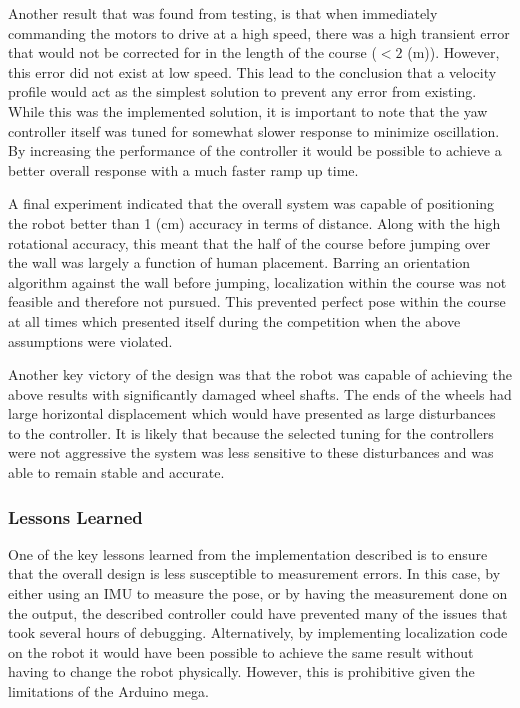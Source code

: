 \documentclass[ece]{uw-wkrpt}
\begin{document}
Another result that was found from testing, is that when immediately commanding the motors to drive at a high speed, there was a high transient error that would not be corrected for in the length of the course ($<2$ (m)). However, this error did not exist at low speed. This lead to the conclusion that a velocity profile would act as the simplest solution to prevent any error from existing. While this was the implemented solution, it is important to note that the yaw controller itself was tuned for somewhat slower response to minimize oscillation. By increasing the performance of the controller it would be possible to achieve a better overall response with a much faster ramp up time. 

A final experiment indicated that the overall system was capable of positioning the robot better than 1 (cm) accuracy in terms of distance. Along with the high rotational accuracy, this meant that the half of the course before jumping over the wall was largely a function of human placement. Barring an orientation algorithm against the wall before jumping, localization within the course was not feasible and therefore not pursued. This prevented perfect pose within the course at all times which presented itself during the competition when the above assumptions were violated. 

Another key victory of the design was that the robot was capable of achieving the above results with significantly damaged wheel shafts. The ends of the wheels had large horizontal displacement which would have presented as large disturbances to the controller. It is likely that because the selected tuning for the controllers were not aggressive the system was less sensitive to these disturbances and was able to remain stable and accurate.
\subsubsection{Lessons Learned}

One of the key lessons learned from the implementation described is to ensure that the overall design is less susceptible to measurement errors. In this case, by either using an IMU to measure the pose, or by having the measurement done on the output, the described controller could have prevented many of the issues that took several hours of debugging. Alternatively, by implementing localization code on the robot it would have been possible to achieve the same result without having to change the robot physically. However, this is prohibitive given the limitations of the Arduino mega. 
\end{document}

